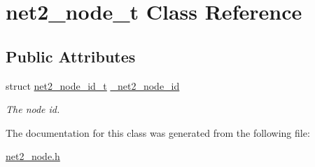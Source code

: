 \hypertarget{structnet2__node__t}{\section{net2\-\_\-node\-\_\-t Class Reference}
\label{structnet2__node__t}
}
\subsection*{Public Attributes}
\begin{DoxyCompactItemize}
\item 
\hypertarget{structnet2__node__t_a9ff8fd051476d5c5d9c46d8ee3fbe466}{struct \hyperlink{structnet2__node__id__t}{net2\-\_\-node\-\_\-id\-\_\-t} \hyperlink{structnet2__node__t_a9ff8fd051476d5c5d9c46d8ee3fbe466}{\-\_\-net2\-\_\-node\-\_\-id}}\label{structnet2__node__t_a9ff8fd051476d5c5d9c46d8ee3fbe466}

\begin{DoxyCompactList}\small\item\em The node id. \end{DoxyCompactList}\end{DoxyCompactItemize}


The documentation for this class was generated from the following file\-:\begin{DoxyCompactItemize}
\item 
\hyperlink{net2__node_8h}{net2\-\_\-node.\-h}\end{DoxyCompactItemize}
